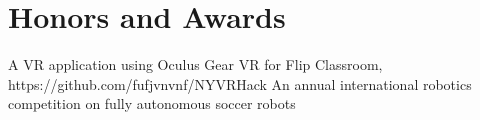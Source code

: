 \documentclass{resume}
\begin{document}
\section{Honors and Awards}
A VR application using Oculus Gear VR for Flip Classroom, https://github.com/fufjvnvnf/NYVRHack
An annual international robotics competition on fully autonomous soccer robots

%
%
\end{document}
